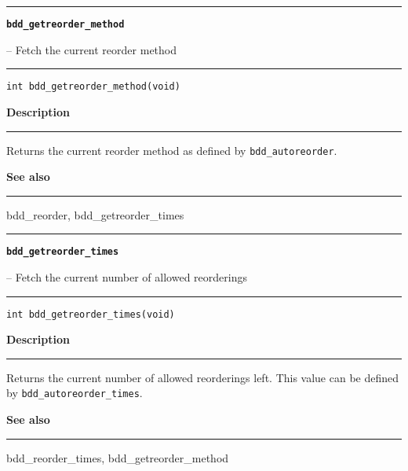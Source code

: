 \begin{minipage}{\textwidth}

\noindent\begin{minipage}{\textwidth}
\rule{\textwidth}{0.5mm}
{\tt\bf bdd\_getreorder\_method }
\--- Fetch the current reorder method  \hspace{\fill}
\\\rule[1.5ex]{\textwidth}{0.5mm}
\end{minipage}

\noindent\begin{verbatim}
int bdd_getreorder_method(void) 
\end{verbatim}

\vspace{\parsep}\noindent
{\bf Description}\\\rule[1.5ex]{\textwidth}{0.2mm}\vspace{-1.5ex}\setlength{\parindent}{1em}
Returns the current reorder method as defined by
           {\tt bdd\_autoreorder}. 

\vspace{\parsep}\vspace{\baselineskip}\noindent
{\bf See also}\\\rule[1.5ex]{\textwidth}{0.2mm}\vspace{-1.5ex}
bdd\_reorder, bdd\_getreorder\_times 
\end{minipage}
\vspace{8ex}
\begin{minipage}{\textwidth}

\noindent\begin{minipage}{\textwidth}
\rule{\textwidth}{0.5mm}
{\tt\bf bdd\_getreorder\_times }
\--- Fetch the current number of allowed reorderings  \hspace{\fill}
\\\rule[1.5ex]{\textwidth}{0.5mm}
\end{minipage}

\noindent\begin{verbatim}
int bdd_getreorder_times(void) 
\end{verbatim}

\vspace{\parsep}\noindent
{\bf Description}\\\rule[1.5ex]{\textwidth}{0.2mm}\vspace{-1.5ex}\setlength{\parindent}{1em}
Returns the current number of allowed reorderings left. This
           value can be defined by {\tt bdd\_autoreorder\_times}. 

\vspace{\parsep}\vspace{\baselineskip}\noindent
{\bf See also}\\\rule[1.5ex]{\textwidth}{0.2mm}\vspace{-1.5ex}
bdd\_reorder\_times, bdd\_getreorder\_method 
\end{minipage}
